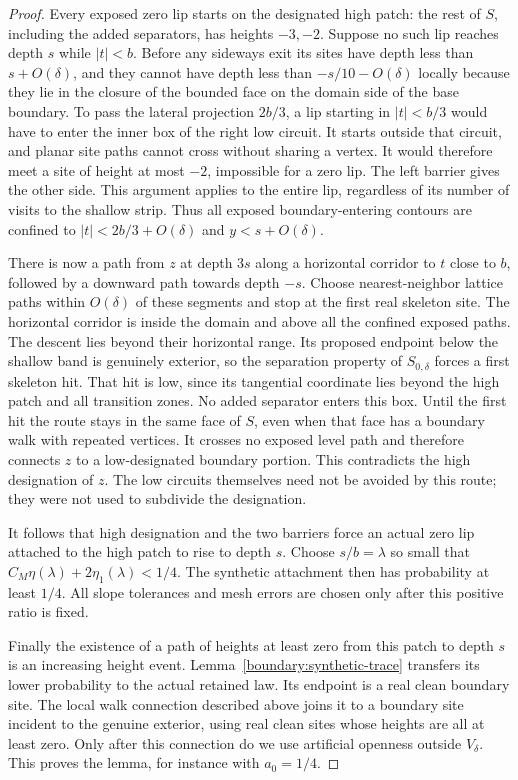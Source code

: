 \documentclass[11pt]{article}
\theoremstyle{definition}
\theoremstyle{remark}
\numberwithin{equation}{section}
\begin{document}
\begin{proof}
Every exposed zero lip starts on the designated high patch: the
rest of $S$, including the added separators, has heights $-3,-2$.
Suppose no such lip reaches depth $s$ while $|t|<b$.  Before any
sideways exit its sites have depth less than $s+O(\delta)$, and
they cannot have depth less than $-s/10-O(\delta)$ locally because
they lie in the closure of the bounded face on the domain side of
the base boundary.  To pass the lateral projection $2b/3$, a lip
starting in $|t|<b/3$ would have to enter the inner box of the right
low circuit.  It starts outside that circuit, and planar site paths
cannot cross without sharing a vertex.  It would therefore meet a
site of height at most $-2$, impossible for a zero lip.  The left
barrier gives the other side.  This argument applies to the entire
lip, regardless of its number of visits to the shallow strip.
Thus all exposed boundary-entering contours are confined to
$|t|<2b/3+O(\delta)$ and $y<s+O(\delta)$.

There is now a path from $z$ at depth $3s$ along a horizontal
corridor to $t$ close to $b$, followed by a downward path towards
depth $-s$.  Choose nearest-neighbor lattice paths within
$O(\delta)$ of these segments and stop at the first real skeleton
site.  The horizontal corridor is inside the domain and above all
the confined exposed paths.  The descent lies beyond their
horizontal range.  Its proposed endpoint below the shallow band is
genuinely exterior, so the separation property of $S_{0,\delta}$
forces a first skeleton hit.  That hit is low, since its tangential
coordinate lies beyond the high patch and all transition zones.
No added separator enters this box.  Until the first hit the route
stays in the same face of $S$, even when that face has a boundary
walk with repeated vertices.  It crosses no exposed level path and
therefore connects $z$ to a low-designated boundary portion.  This
contradicts the high designation of $z$.  The low circuits themselves
need not be avoided by this route; they were not used to subdivide
the designation.

It follows that high designation and the two barriers force an
actual zero lip attached to the high patch to rise to depth $s$.
Choose $s/b=\lambda$ so small that
$C_M\eta(\lambda)+2\eta_1(\lambda)<1/4$.
The synthetic attachment then has probability at least $1/4$.
All slope tolerances and mesh errors are chosen only after this
positive ratio is fixed.

Finally the existence of a path of heights at least zero from this
patch to depth $s$ is an increasing height event.
Lemma~\ref{boundary:synthetic-trace} transfers its lower probability
to the actual retained law.  Its endpoint is a real clean boundary
site.  The local walk connection described above joins it to a
boundary site incident to the genuine exterior, using real clean
sites whose heights are all at least zero.  Only after this
connection do we use artificial openness outside $V_\delta$.
This proves the lemma, for instance with $a_0=1/4$.
\end{proof}
\end{document}
